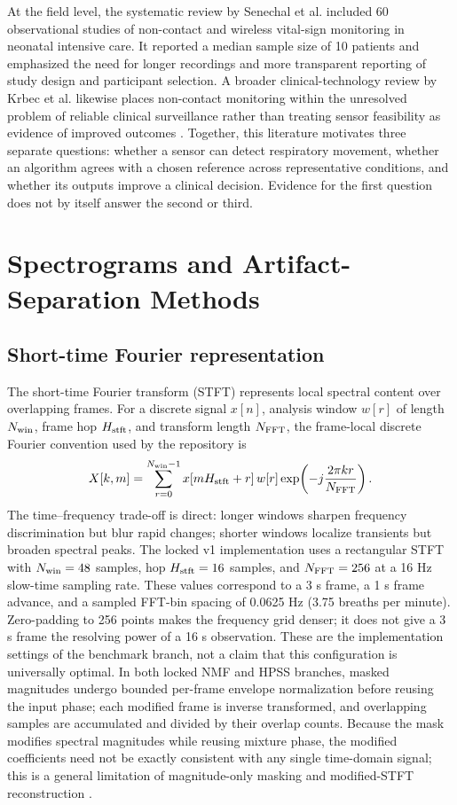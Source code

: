 At the field level, the systematic review by Senechal et al. included 60 observational studies of
non-contact and wireless vital-sign monitoring in neonatal intensive care. It reported a median
sample size of 10 patients and emphasized the need for longer recordings and more transparent
reporting of study design and participant selection. A broader clinical-technology review by
Krbec et al. likewise places non-contact monitoring within the unresolved problem of reliable
clinical surveillance rather than treating sensor feasibility as evidence of improved outcomes
\citep{senechal2026next,krbec2024emerging}. Together, this literature motivates three separate
questions: whether a sensor can detect respiratory movement, whether an algorithm agrees with a
chosen reference across representative conditions, and whether its outputs improve a clinical
decision. Evidence for the first question does not by itself answer the second or third.

\section{Spectrograms and Artifact-Separation Methods}
\label{sec:ch2_separation}

\subsection{Short-time Fourier representation}

The short-time Fourier transform (STFT) represents local spectral content over overlapping frames.
For a discrete signal $x[n]$, analysis window $w[r]$ of length $N_{\mathrm{win}}$, frame hop $H_{\mathrm{stft}}$,
and transform length $N_{\mathrm{FFT}}$, the frame-local discrete Fourier convention used by the repository
is
\begin{equation}
  X[k,m]=\sum_{r=0}^{N_{\mathrm{win}}-1} x[mH_{\mathrm{stft}}+r]\,w[r]
  \exp\!\left(-j\frac{2\pi kr}{N_{\mathrm{FFT}}}\right).
  \label{eq:ch2_stft}
\end{equation}
The time--frequency trade-off is direct: longer windows sharpen frequency discrimination but blur
rapid changes; shorter windows localize transients but broaden spectral peaks. The locked v1
implementation uses a rectangular STFT with $N_{\mathrm{win}}=48$ samples, hop
$H_{\mathrm{stft}}=16$ samples, and $N_{\mathrm{FFT}}=256$ at a 16 Hz slow-time sampling rate.
These values correspond to a 3 s frame, a 1 s frame advance, and a sampled FFT-bin spacing of
0.0625 Hz (3.75 breaths per minute). Zero-padding to 256 points makes the frequency grid denser;
it does not give a 3 s frame the resolving power of a 16 s observation. These are the
implementation settings of the benchmark branch, not a claim that this configuration is
universally optimal. In both locked NMF and HPSS branches, masked magnitudes undergo bounded
per-frame envelope normalization before reusing the input phase; each modified frame is inverse
transformed, and overlapping samples are accumulated and divided by their overlap counts. Because
the mask modifies spectral magnitudes while reusing mixture phase, the modified coefficients need
not be exactly consistent with any single time-domain signal; this is a general limitation of
magnitude-only masking and modified-STFT reconstruction \citep{griffin1984signal,muller2021fundamentals}.

